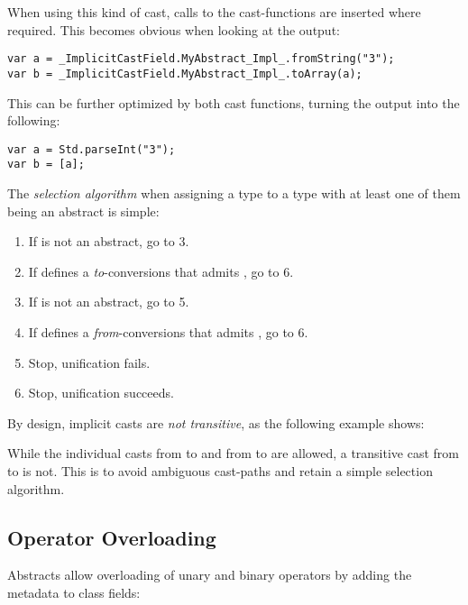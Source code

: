 When using this kind of cast, calls to the cast-functions are inserted where required. This becomes obvious when looking at the  output:

\begin{lstlisting}
var a = _ImplicitCastField.MyAbstract_Impl_.fromString("3");
var b = _ImplicitCastField.MyAbstract_Impl_.toArray(a);
\end{lstlisting}
This can be further optimized by  both cast functions, turning the output into the following:

\begin{lstlisting}
var a = Std.parseInt("3");
var b = [a];
\end{lstlisting}
The \emph{selection algorithm} when assigning a type  to a type  with at least one of them being an abstract is simple:

\begin{enumerate}
	\item If  is not an abstract, go to 3.
	\item If  defines a \emph{to}-conversions that admits , go to 6.
	\item If  is not an abstract, go to 5.
	\item If  defines a \emph{from}-conversions that admits , go to 6.
	\item Stop, unification fails.
	\item Stop, unification succeeds.
\end{enumerate}



By design, implicit casts are \emph{not transitive}, as the following example shows:

While the individual casts from  to  and from  to  are allowed, a transitive cast from  to  is not. This is to avoid ambiguous cast-paths and retain a simple selection algorithm. 




\subsection{Operator Overloading}
\label{types-abstract-operator-overloading}

Abstracts allow overloading of unary and binary operators by adding the  metadata to class fields:

